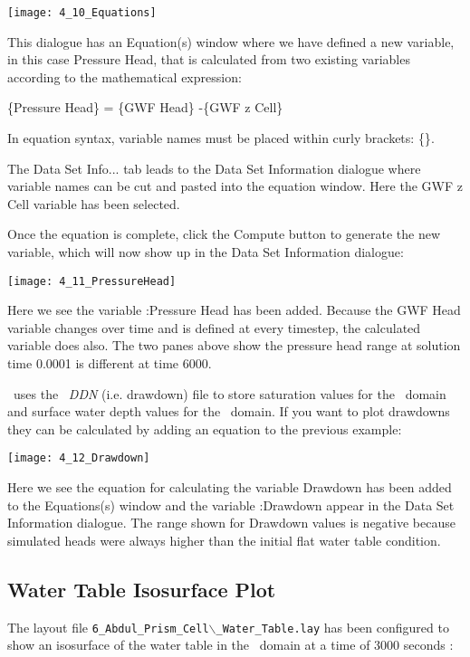         \texttt{[image: 4\_10\_Equations]}

This dialogue has an {\sf Equation(s)} window where we have defined a new variable, in this case {\sf Pressure Head},  that is calculated from two existing variables according to the  mathematical expression: 

{\sf \{Pressure Head\} = \{GWF Head\}  -\{GWF z Cell\}}  

In equation syntax, variable names must be placed within curly brackets: {\sf \{\}}.

The {\sf Data Set Info...} tab leads to the {\sf Data Set Information} dialogue where variable names can be cut and pasted into the equation window.  Here the {\sf GWF z Cell} variable has been selected.

Once the equation is complete, click the {\sf Compute} button to generate the new variable, which will now show up in the {\sf Data Set Information} dialogue:

        \texttt{[image: 4\_11\_PressureHead]}

Here we see the variable {:Pressure Head} has been added. Because the {\sf GWF Head} variable changes over time and is defined at every timestep, the calculated variable does also.  The two panes above show the pressure head range at solution time 0.0001 is different at time 6000.

\mfus\ uses the \mf\ {\it DDN} (i.e. drawdown) file to store saturation values for the \gwf\ domain and surface water depth values for the \swf\ domain. If you want to plot drawdowns they can be calculated by adding an equation to the previous example:

        \texttt{[image: 4\_12\_Drawdown]}

Here we see the equation for calculating the variable {\sf Drawdown} has been added to the {\sf Equations(s)} window and the variable {:Drawdown} appear in the {\sf Data Set Information} dialogue.  The range shown for {\sf Drawdown} values is negative because simulated heads were always higher than the initial flat water table condition.

\subsection{Water Table Isosurface Plot}
The layout file {\tt 6\_Abdul\_Prism\_Cell$\backslash$\_Water\_Table.lay} has been configured to show an isosurface of the water table in the \gwf\ domain at a time of 3000 seconds :

